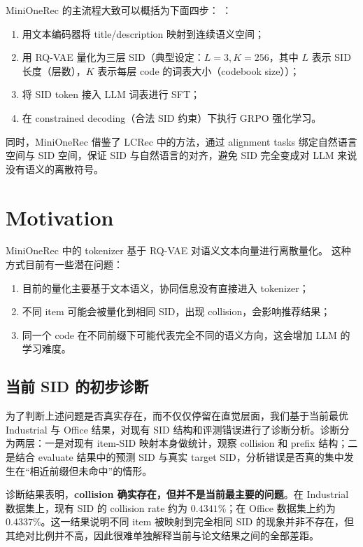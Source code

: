 \documentclass[11pt]{article}
\begin{document}
MiniOneRec 的主流程大致可以概括为下面四步： \cite{kong2025minionerec}：
\begin{enumerate}
  \item 用文本编码器将 title/description 映射到连续语义空间；
  \item 用 RQ-VAE \cite{lee2022rqvae} 量化为三层 SID（典型设定：$L=3, K=256$，其中 $L$ 表示 SID 长度（层数），$K$ 表示每层 code 的词表大小（codebook size））；
  \item 将 SID token 接入 LLM 词表进行 SFT；
  \item 在 constrained decoding（合法 SID 约束）下执行 GRPO 强化学习。
\end{enumerate}
同时，MiniOneRec 借鉴了 LCRec \cite{zheng2023lcrec} 中的方法，通过 alignment tasks 绑定自然语言空间与 SID 空间，保证 SID 与自然语言的对齐，避免 SID 完全变成对 LLM 来说没有语义的离散符号。


\section{Motivation}

MiniOneRec 中的 tokenizer 基于 RQ-VAE \cite{lee2022rqvae} 对语义文本向量进行离散量化。
这种方式目前有一些潜在问题：
\begin{enumerate}
  \item 目前的量化主要基于文本语义，协同信息没有直接进入 tokenizer；
  \item 不同 item 可能会被量化到相同 SID，出现 collision，会影响推荐结果；
  \item 同一个 code 在不同前缀下可能代表完全不同的语义方向，这会增加 LLM 的学习难度。
\end{enumerate}

\subsection{当前 SID 的初步诊断}

为了判断上述问题是否真实存在，而不仅仅停留在直觉层面，我们基于当前最优 Industrial 与 Office 结果，对现有 SID 结构和评测错误进行了诊断分析。诊断分为两层：一是对现有 item-SID 映射本身做统计，观察 collision 和 prefix 结构；二是结合 evaluate 结果中的预测 SID 与真实 target SID，分析错误是否真的集中发生在“相近前缀但未命中”的情形。

诊断结果表明，\textbf{collision 确实存在，但并不是当前最主要的问题}。在 Industrial 数据集上，现有 SID 的 collision rate 约为 $0.4341\%$；在 Office 数据集上约为 $0.4337\%$。这一结果说明不同 item 被映射到完全相同 SID 的现象并非不存在，但其绝对比例并不高，因此很难单独解释当前与论文结果之间的全部差距。
\end{document}
